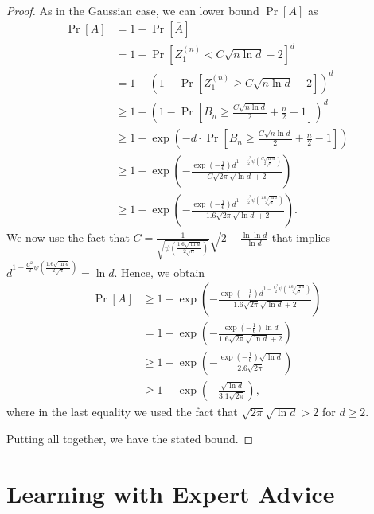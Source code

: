\documentclass{article}
\begin{document}
\begin{proof}
As in the Gaussian case, we can lower bound $\Pr[A]$ as
\begin{align*}
\Pr[A]
& = 1 - \Pr \left[ \overline{A} \right] \\
& = 1 - \Pr \left[ Z^{(n)}_1 < C \sqrt{n \ln d} - 2 \right]^d \\
& = 1 - \left(1 - \Pr\left[Z^{(n)}_1\ge C \sqrt{n \ln d}-2 \right] \right)^d \\
& \ge 1 - \left(1 - \Pr\left[B_n \ge \frac{C \sqrt{n \ln d}}{2} +\frac{n}{2} - 1 \right] \right)^d \\
& \ge 1-\exp\left(-d \cdot \Pr \left[ B_n \ge \frac{C \sqrt{n \ln d}}{2} +\frac{n}{2}-1 \right] \right) \\
& \ge 1 - \exp\left(-\frac{\exp\left(-\frac{1}{6}\right) d^{1-\frac{C^2}{2} \psi\left(\frac{C \sqrt{\ln d}}{2 \sqrt{n}}\right)}}{C \sqrt{2\pi} \sqrt{\ln d}+2}\right) \\
& \ge 1 - \exp\left(-\frac{\exp\left(-\frac{1}{6}\right) d^{1-\frac{C^2}{2} \psi\left(\frac{1.6 \sqrt{\ln d}}{2 \sqrt{n}}\right)}}{1.6 \sqrt{2\pi} \sqrt{\ln d}+2}\right).
\end{align*}
We now use the fact that $C=\frac{1}{\sqrt{\psi\left(\frac{1.6 \sqrt{\ln d}}{2 \sqrt{n}}\right)}}\sqrt{2- \frac{\ln \ln d}{\ln d}}$ that implies $d^{1-\frac{C^2}{2} \psi\left(\frac{1.6 \sqrt{\ln d}}{2 \sqrt{n}}\right)}=\ln d$. Hence, we obtain
\begin{align*}
\Pr[A]
& \ge 1 - \exp\left(-\frac{\exp\left(-\frac{1}{6}\right) d^{1-\frac{C^2}{2} \psi\left(\frac{1.6 \sqrt{\ln d}}{2 \sqrt{n}}\right)}}{1.6 \sqrt{2\pi} \sqrt{\ln d}+2}\right) \\
& = 1 - \exp\left(-\frac{\exp\left(-\frac{1}{6}\right) \ln d}{1.6 \sqrt{2\pi} \sqrt{\ln d}+2}\right) \\
& \ge 1 - \exp\left(-\frac{\exp\left(-\frac{1}{6}\right) \sqrt{\ln d}}{2.6 \sqrt{2\pi}}\right)\\
& \ge 1 - \exp\left(-\frac{\sqrt{\ln d}}{3.1 \sqrt{2\pi}}\right),
\end{align*}
where in the last equality we used the fact that $\sqrt{2\pi} \sqrt{\ln d} > 2$ for $d\ge 2$.

Putting all together, we have the stated bound.
\end{proof}

\section{Learning with Expert Advice}
\label{section:experts}
\end{document}
